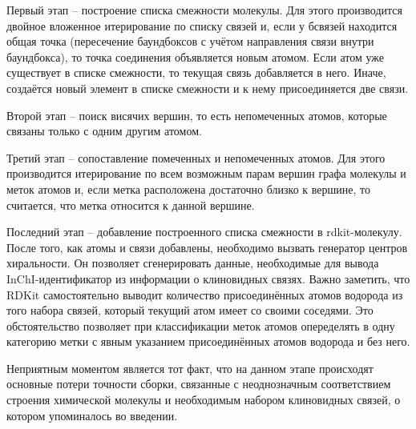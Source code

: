 Первый этап -- построение списка смежности молекулы. Для этого производится двойное вложенное итерирование по списку связей и, если у бсвязей находится общая точка (пересечение баундбоксов с учётом направления связи внутри баундбокса), то точка соединения объявляется новым атомом. Если атом уже существует в списке смежности, то текущая связь добавляется в него. Иначе, создаётся новый элемент в списке смежности и к нему присоединяется две связи.

Второй этап -- поиск висячих вершин, то есть непомеченных атомов, которые связаны только с одним другим атомом.

Третий этап -- сопоставление помеченных и непомеченных атомов. Для этого производится итерирование по всем возможным парам вершин графа молекулы и меток атомов и, если метка расположена достаточно близко к вершине, то считается, что метка относится к данной вершине.

Последний этап -- добавление построенного списка смежности в rdkit-молекулу. После того, как атомы и связи добавлены, необходимо вызвать генератор центров хиральности. Он позволяет сгенерировать данные, необходимые для вывода InChI-идентификатор из информации о клиновидных связях. Важно заметить, что RDKit самостоятельно выводит количество присоединённых атомов водорода из того набора связей, который текущий атом имеет со своими соседями. Это обстоятельство позволяет при классификации меток атомов опеределять в одну категорию метки с явным указанием присоединённых атомов водорода и без него.

Неприятным моментом является тот факт, что на данном этапе происходят основные потери точности сборки, связанные с неоднозначным соответствием строения химической молекулы и необходимым набором клиновидных связей, о котором упоминалось во введении.

%


